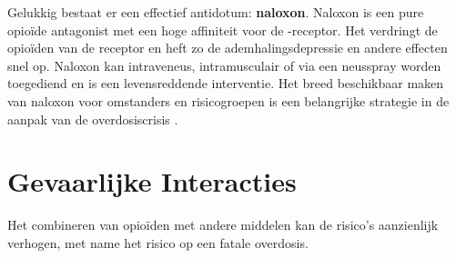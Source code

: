 \documentclass[11pt, a4paper]{report} %
\begin{document}
Gelukkig bestaat er een effectief antidotum: \textbf{naloxon}. Naloxon is een pure opioïde antagonist met een hoge affiniteit voor de \textmu-receptor. Het verdringt de opioïden van de receptor en heft zo de ademhalingsdepressie en andere effecten snel op. Naloxon kan intraveneus, intramusculair of via een neusspray worden toegediend en is een levensreddende interventie. Het breed beschikbaar maken van naloxon voor omstanders en risicogroepen is een belangrijke strategie in de aanpak van de overdosiscrisis \parencite{CDCPreventingOverdose}.

\section{Gevaarlijke Interacties}
\label{sec:interacties}
Het combineren van opioïden met andere middelen kan de risico's aanzienlijk verhogen, met name het risico op een fatale overdosis.
\end{document}
